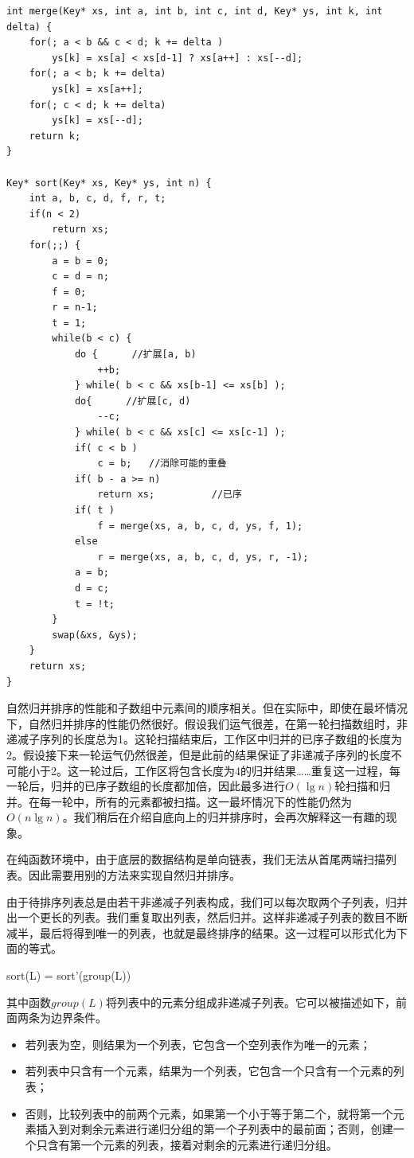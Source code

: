\documentclass[b5paper]{ctexart}
\begin{document}
\lstset{language=C}
\begin{lstlisting}
int merge(Key* xs, int a, int b, int c, int d, Key* ys, int k, int delta) {
    for(; a < b && c < d; k += delta )
        ys[k] = xs[a] < xs[d-1] ? xs[a++] : xs[--d];
    for(; a < b; k += delta)
        ys[k] = xs[a++];
    for(; c < d; k += delta)
        ys[k] = xs[--d];
    return k;
}

Key* sort(Key* xs, Key* ys, int n) {
    int a, b, c, d, f, r, t;
    if(n < 2)
        return xs;
    for(;;) {
        a = b = 0;
        c = d = n;
        f = 0;
        r = n-1;
        t = 1;
        while(b < c) {
            do {      //扩展[a, b)
                ++b;
            } while( b < c && xs[b-1] <= xs[b] );
            do{      //扩展[c, d)
                --c;
            } while( b < c && xs[c] <= xs[c-1] );
            if( c < b )
                c = b;   //消除可能的重叠
            if( b - a >= n)
                return xs;          //已序
            if( t )
                f = merge(xs, a, b, c, d, ys, f, 1);
            else
                r = merge(xs, a, b, c, d, ys, r, -1);
            a = b;
            d = c;
            t = !t;
        }
        swap(&xs, &ys);
    }
    return xs;
}
\end{lstlisting}

自然归并排序的性能和子数组中元素间的顺序相关。但在实际中，即使在最坏情况下，自然归并排序的性能仍然很好。假设我们运气很差，在第一轮扫描数组时，非递减子序列的长度总为1。这轮扫描结束后，工作区中归并的已序子数组的长度为2。假设接下来一轮运气仍然很差，但是此前的结果保证了非递减子序列的长度不可能小于2。这一轮过后，工作区将包含长度为4的归并结果……重复这一过程，每一轮后，归并的已序子数组的长度都加倍，因此最多进行$O(\lg n)$轮扫描和归并。在每一轮中，所有的元素都被扫描。这一最坏情况下的性能仍然为$O(n \lg n)$。我们稍后在介绍自底向上的归并排序时，会再次解释这一有趣的现象。

在纯函数环境中，由于底层的数据结构是单向链表，我们无法从首尾两端扫描列表。因此需要用别的方法来实现自然归并排序。

由于待排序列表总是由若干非递减子列表构成，我们可以每次取两个子列表，归并出一个更长的列表。我们重复取出列表，然后归并。这样非递减子列表的数目不断减半，最后将得到唯一的列表，也就是最终排序的结果。这一过程可以形式化为下面的等式。

\be
sort(L) = sort'(group(L))
\ee

其中函数$group(L)$将列表中的元素分组成非递减子列表。它可以被描述如下，前面两条为边界条件。

\begin{itemize}
\item 若列表为空，则结果为一个列表，它包含一个空列表作为唯一的元素；
\item 若列表中只含有一个元素，结果为一个列表，它包含一个只含有一个元素的列表；
\item 否则，比较列表中的前两个元素，如果第一个小于等于第二个，就将第一个元素插入到对剩余元素进行递归分组的第一个子列表中的最前面；否则，创建一个只含有第一个元素的列表，接着对剩余的元素进行递归分组。
\end{itemize}
\end{document}
